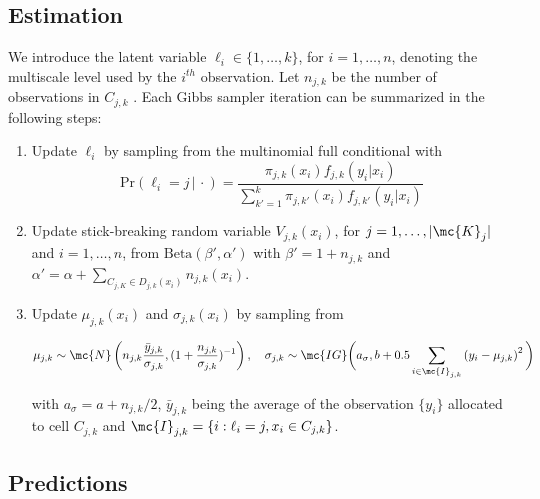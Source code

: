 \subsection{Estimation}



We introduce the latent variable $\ell_i \in \{1,\ldots,k\}$, for $i=1,\ldots,n$, denoting the multiscale level used by the $i^{th}$ observation.  
Let $n_{j,k}$ be  the number of observations in $C_{j,k}$ . Each Gibbs sampler iteration can be summarized in the following steps:

\begin{enumerate}
\item Update $\ell_i$ by sampling from the multinomial full conditional with 
\[\mbox{Pr}( \ell_i = j\, |\, \cdot) = \frac{ \pi_{j,k}(x_i)f_{j,k}(y_i|x_i) }{ \sum_{k'=1}^k \pi_{j,k'}(x_i)f_{j,k'}(y_i | x_i) } \label{eq:prS}\]

\item Update stick-breaking random variable $V_{j,k}(x_i)$, for $j=1, \ldots, |\mc{K}_j|$ and $i=1, \ldots, n$, from $\mbox{Beta}(\beta',\alpha')$ with $\beta'=1+n_{j,k}$ and $\alpha'=\alpha+\sum_{C_{j,K} \in D_{j,k}(x_i)} n_{j,k}(x_i)$.

\item Update $\mu_{j,k}(x_i)$ and $\sigma_{j,k}(x_i)$ by sampling from

\begin{align*}
	\mu_{j,k} \sim \mc{N}\left(n_{j,k}\frac{\bar{y}_{j,k}}{ \sigma_{j,k}} , (1+\frac{n_{j,k}}{\sigma_{j,k}})^{-1}\right), \quad
	 \sigma_{j,k} \sim \mc{IG}\bigg(a_{\sigma},b+0.5\sum_{i \in \mc{I}_{j,k}} \left(y_{i}-\mu_{j,k}\right)^2\bigg)	
\end{align*}

with $a_{\sigma}=a+n_{j,k}/2$, $\bar{y}_{j,k}$ being the average of the observation $\{y_i\}$ allocated to cell $C_{j,k}$ and $\mc{I}_{j,k}=\{i : \ell_i=j, x_i \in C_{j,k}\}$.

\end{enumerate}



\subsection{Predictions}\label{ch3:predictions}


